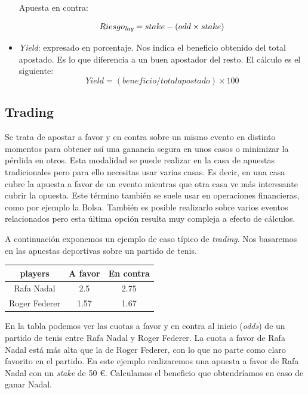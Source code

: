 \begin{itemize}
	Apuesta en contra:
	
 \begin{displaymath}
 Riesgo_\emph{lay} = stake - (odd \times stake)
\end{displaymath}

\item \emph{Yield}: expresado en porcentaje. Nos indica el beneficio obtenido del total apostado. Es lo que diferencia a un buen apostador del resto. El cálculo es el siguiente:
\begin{displaymath}
 Yield = (beneficio / total apostado) \times 100 
\end{displaymath}
\end{itemize} 


 
 \subsection{Trading}
 
 Se trata de apostar a favor y en contra sobre un mismo evento en distinto momentos para obtener así una ganancia segura en unos casos o minimizar la pérdida en otros.  Esta modalidad se puede realizar en la casa de apuestas tradicionales pero para ello necesitas usar varias casas.  Es decir, en una casa cubre la apuesta a favor de un evento mientras que otra casa ve más interesante cubrir la opuesta. Este término también se suele usar en operaciones financieras, como por ejemplo la Bolsa. También es posible realizarlo sobre varios eventos relacionados pero esta última opción resulta muy compleja a efecto de cálculos.
 
A continuación exponemos un ejemplo de caso típico de \emph{trading}. Nos basaremos en las apuestas deportivas sobre un partido de tenis.
 
 \begin{center}
    \begin{tabular}{| c | c | c |}
      \hline
      \hline
      players & A favor & En contra\\
      \hline
      \hline
      Rafa Nadal & 2.5 & 2.75\\
      \hline
      \hline
      Roger Federer & 1.57 & 1.67\\
      \hline
      \hline
    \end{tabular}
  \end{center}


En la tabla podemos ver las cuotas a favor y en contra al inicio (\emph{odds}) de un partido de tenis entre Rafa Nadal y Roger Federer. La cuota a favor de Rafa Nadal está más alta que la de Roger Federer, con lo que no parte como claro favorito en el partido. En este ejemplo realizaremos una apuesta a favor de Rafa Nadal con un \emph{stake} de 50 \euro . Calculamos el beneficio que obtendríamos en caso de ganar Nadal.

